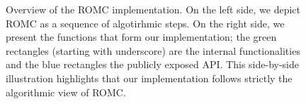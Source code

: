 \begin{figure}[ht]
\begin{center}
{
    }
  \end{center}
  \caption{Overview of the ROMC implementation. On the left side, we
    depict ROMC as a sequence of algotirhmic steps. On the right side,
    we present the functions that form our implementation; the green
    rectangles (starting with underscore) are the internal
    functionalities and the blue rectangles the publicly exposed
    API. This side-by-side illustration highlights that our
    implementation follows strictly the algorithmic view of ROMC.}
\label{fig:romc_overview}
\end{figure}
